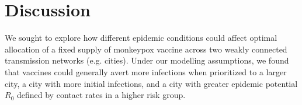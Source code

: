 \section{Discussion}
We sought to explore how different epidemic conditions
could affect optimal allocation of a fixed supply of monkeypox vaccine
across two weakly connected transmission networks (e.g. cities).
Under our modelling assumptions, we found that
vaccines could generally avert more infections when prioritized to
a larger city,
a city with more initial infections, and
a city with greater epidemic potential $R_0$
defined by contact rates in a higher risk group.
